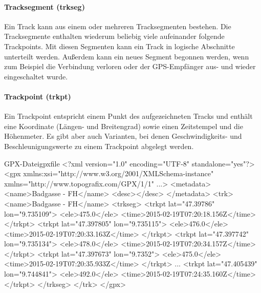 \paragraph{Tracksegment (trkseg)}
Ein Track kann aus einem oder mehreren Tracksegmenten bestehen. Die Tracksegmente enthalten wiederum beliebig viele aufeinander folgende Trackpoints. Mit diesen Segmenten kann ein Track in logische Abschnitte unterteilt werden. Außerdem kann ein neues Segment begonnen werden, wenn zum Beispiel die Verbindung verloren oder der GPS-Empfänger aus- und wieder eingeschaltet wurde. \cite{topografix_gpx_2004}

\paragraph{Trackpoint (trkpt)}
Ein Trackpoint entspricht einem Punkt des aufgezeichneten Tracks und enthält eine Koordinate (Längen- und Breitengrad) sowie einen Zeitstempel und die Höhenmeter. Es gibt aber auch Varianten, bei denen Geschwindigkeits- und Beschleunigungswerte zu einem Trackpoint abgelegt werden. \cite{topografix_gpx_2004}
 
\begin{code}[xml]{GPX-Datei}{gpxfile}
<?xml version="1.0" encoding="UTF-8" standalone="yes"?>
<gpx xmlns:xsi="http://www.w3.org/2001/XMLSchema-instance" xmlns="http://www.topografix.com/GPX/1/1" ...>
    <metadata>
        <name>Badgasse - FH</name>
        <desc></desc>
    </metadata>
    <trk>
        <name>Badgasse - FH</name>
        <trkseg>
            <trkpt lat="47.39786" lon="9.735109">
                <ele>475.0</ele>
                <time>2015-02-19T07:20:18.156Z</time>
            </trkpt>
            <trkpt lat="47.397805" lon="9.735115">
                <ele>476.0</ele>
                <time>2015-02-19T07:20:33.163Z</time>
            </trkpt>
            <trkpt lat="47.397742" lon="9.735134">
                <ele>478.0</ele>
                <time>2015-02-19T07:20:34.157Z</time>
            </trkpt>
            <trkpt lat="47.397673" lon="9.7352">
                <ele>475.0</ele>
                <time>2015-02-19T07:20:35.933Z</time>
            </trkpt>
            ...
            <trkpt lat="47.405439" lon="9.744841">
                <ele>492.0</ele>
                <time>2015-02-19T07:24:35.160Z</time>
            </trkpt>
        </trkseg>
    </trk>
</gpx>
\end{code}

